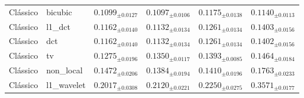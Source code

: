 \begin{table}[htbp]
{\begin{tabular}{llcccc}
Clássico & bicubic & $0.1099_{\pm 0.0127}$ & $0.1097_{\pm 0.0106}$ & $0.1175_{\pm 0.0138}$ & $0.1140_{\pm 0.0113}$ \\
Clássico & l1\_dct & $0.1162_{\pm 0.0140}$ & $0.1132_{\pm 0.0134}$ & $0.1261_{\pm 0.0134}$ & $0.1403_{\pm 0.0156}$ \\
Clássico & dct & $0.1162_{\pm 0.0140}$ & $0.1132_{\pm 0.0134}$ & $0.1261_{\pm 0.0134}$ & $0.1402_{\pm 0.0156}$ \\
Clássico & tv & $0.1275_{\pm 0.0196}$ & $0.1350_{\pm 0.0117}$ & $0.1393_{\pm 0.0085}$ & $0.1464_{\pm 0.0184}$ \\
Clássico & non\_local & $0.1472_{\pm 0.0206}$ & $0.1384_{\pm 0.0194}$ & $0.1410_{\pm 0.0196}$ & $0.1763_{\pm 0.0233}$ \\
Clássico & l1\_wavelet & $0.2017_{\pm 0.0308}$ & $0.2120_{\pm 0.0221}$ & $0.2250_{\pm 0.0275}$ & $0.3571_{\pm 0.0177}$ \\
\bottomrule
\end{tabular}
}
\end{table}
